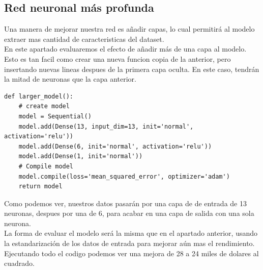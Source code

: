 \subsection{Red neuronal más profunda}
Una manera de mejorar nuestra red es añadir capas, lo cual permitirá al modelo extraer mas cantidad de caracteristicas del dataset.\\
En este apartado evaluaremos el efecto de añadir más de una capa al modelo. Esto es tan facil como crear una nueva funcion copia de la anterior, pero insertando nuevas lineas despues de la primera capa oculta. En este caso, tendrán la mitad de neuronas que la capa anterior.
\begin{verbatim}
def larger_model():
	# create model
	model = Sequential()
	model.add(Dense(13, input_dim=13, init='normal', activation='relu'))
	model.add(Dense(6, init='normal', activation='relu'))
	model.add(Dense(1, init='normal'))
	# Compile model
	model.compile(loss='mean_squared_error', optimizer='adam')
	return model
\end{verbatim}
Como podemos ver, nuestros datos pasarán por una capa de de entrada de 13 neuronas, despues por una de 6, para acabar en una capa de salida con una sola neurona.\\
La forma de evaluar el modelo será la misma que en el apartado anterior, usando la estandarización de los datos de entrada para mejorar aún mas el rendimiento.\\
Ejecutando todo el codigo podemos ver una mejora de 28 a 24 miles de dolares al cuadrado.
